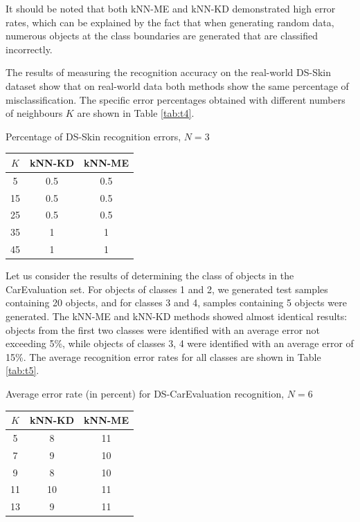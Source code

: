 \documentclass[entropy,article,submit,moreauthors,pdftex]{Definitions/mdpi}
\begin{document}
\begin{paracol}{2}
It should be noted that both kNN-ME and kNN-KD demonstrated high error rates, which can be explained by the fact that when generating random data, numerous objects at the class boundaries are generated that are classified incorrectly.

The results of measuring the recognition accuracy on the real-world DS-Skin dataset show that on real-world data both methods show the same percentage of misclassification. The specific error percentages obtained with different numbers of neighbours $K$ are shown in Table \ref{tab:t4}.

\begin{specialtable}[H] 
  \caption{Percentage of DS-Skin recognition errors, $N=3$}\label{tab:t4}
	\center
\begin{tabular}{ccc}
\toprule
$K$ & kNN-KD & kNN-ME \\
\midrule													
5 & 0.5 & 0.5 \\
15 & 0.5 & 0.5 \\
25 & 0.5 & 0.5\\
35 & 1 & 1\\
45 & 1 & 1\\
\bottomrule
\end{tabular}
\end{specialtable}

Let us consider the results of determining the class of objects in the CarEvaluation set. For objects of classes 1 and 2, we generated test samples containing 20 objects, and for classes 3 and 4, samples containing 5 objects were generated. The kNN-ME and kNN-KD methods showed almost identical results: objects from the first two classes were identified with an average error not exceeding 5\%, while objects of classes 3, 4 were identified with an average error of 15\%. The average recognition error rates for all classes are shown in Table \ref{tab:t5}.

\begin{specialtable}[H] 
  \caption{Average error rate (in percent) for DS-CarEvaluation recognition, $N = 6$}\label{tab:t5}
	\center
\begin{tabular}{ccc}
\toprule
$K$ & kNN-KD & kNN-ME \\
\midrule													
5 & 8 & 11 \\
7 & 9 & 10 \\
9 & 8 & 10 \\
11 & 10 & 11 \\
13 & 9 & 11 \\
\bottomrule
\end{tabular}
\end{specialtable}


\end{paracol}
\end{document}
